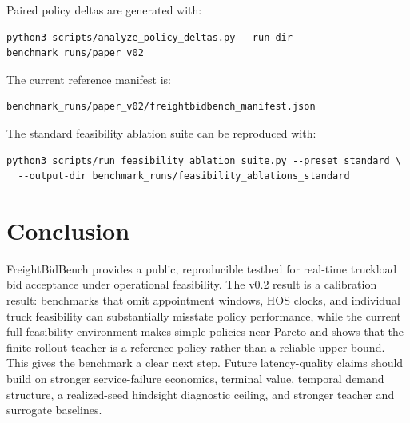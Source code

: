 \documentclass[11pt]{article}
\begin{document}
Paired policy deltas are generated with:
\begin{verbatim}
python3 scripts/analyze_policy_deltas.py --run-dir benchmark_runs/paper_v02
\end{verbatim}

The current reference manifest is:
\begin{verbatim}
benchmark_runs/paper_v02/freightbidbench_manifest.json
\end{verbatim}

The standard feasibility ablation suite can be reproduced with:
\begin{verbatim}
python3 scripts/run_feasibility_ablation_suite.py --preset standard \
  --output-dir benchmark_runs/feasibility_ablations_standard
\end{verbatim}

\section{Conclusion}

FreightBidBench provides a public, reproducible testbed for real-time truckload
bid acceptance under operational feasibility. The v0.2 result is a calibration
result: benchmarks that omit appointment windows, HOS clocks, and individual
truck feasibility can substantially misstate policy performance, while the
current full-feasibility environment makes simple policies near-Pareto and
shows that the finite rollout teacher is a reference policy rather than a
reliable upper bound. This gives the benchmark a clear next step. Future
latency-quality claims should build on stronger service-failure economics,
terminal value, temporal demand structure, a realized-seed hindsight diagnostic
ceiling, and stronger teacher and surrogate baselines.



\end{document}
